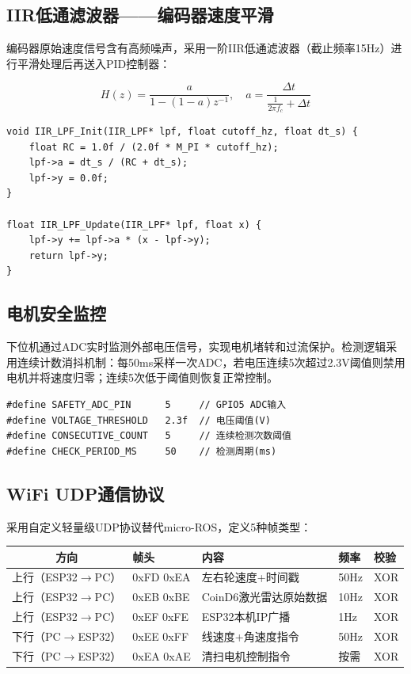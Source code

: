 \documentclass[12pt,a4paper]{ctexart}
\begin{document}
\subsection{IIR低通滤波器——编码器速度平滑}

编码器原始速度信号含有高频噪声，采用一阶IIR低通滤波器（截止频率15Hz）进行平滑处理后再送入PID控制器：

\begin{equation}
    H(z) = \frac{a}{1-(1-a)z^{-1}}, \quad a = \frac{\Delta t}{\frac{1}{2\pi f_c} + \Delta t}
\end{equation}

\begin{lstlisting}[style=cstyle, caption={IIR低通滤波器实现（截止频率15Hz）}]
void IIR_LPF_Init(IIR_LPF* lpf, float cutoff_hz, float dt_s) {
    float RC = 1.0f / (2.0f * M_PI * cutoff_hz);
    lpf->a = dt_s / (RC + dt_s);
    lpf->y = 0.0f;
}

float IIR_LPF_Update(IIR_LPF* lpf, float x) {
    lpf->y += lpf->a * (x - lpf->y);
    return lpf->y;
}
\end{lstlisting}

\subsection{电机安全监控}

下位机通过ADC实时监测外部电压信号，实现电机堵转和过流保护。检测逻辑采用连续计数消抖机制：每50ms采样一次ADC，若电压连续5次超过2.3V阈值则禁用电机并将速度归零；连续5次低于阈值则恢复正常控制。

\begin{lstlisting}[style=cstyle, caption={电机安全检测参数}]
#define SAFETY_ADC_PIN      5     // GPIO5 ADC输入
#define VOLTAGE_THRESHOLD   2.3f  // 电压阈值(V)
#define CONSECUTIVE_COUNT   5     // 连续检测次数阈值
#define CHECK_PERIOD_MS     50    // 检测周期(ms)
\end{lstlisting}

\subsection{WiFi UDP通信协议}

采用自定义轻量级UDP协议替代micro-ROS，定义5种帧类型：

\begin{center}
\begin{tabular}{cllll}
\toprule
\textbf{方向} & \textbf{帧头} & \textbf{内容} & \textbf{频率} & \textbf{校验} \\
\midrule
上行（ESP32$\to$PC） & 0xFD 0xEA & 左右轮速度+时间戳 & 50Hz & XOR \\
上行（ESP32$\to$PC） & 0xEB 0xBE & CoinD6激光雷达原始数据 & 10Hz & XOR \\
上行（ESP32$\to$PC） & 0xEF 0xFE & ESP32本机IP广播 & 1Hz & XOR \\
下行（PC$\to$ESP32） & 0xEE 0xFF & 线速度+角速度指令 & 50Hz & XOR \\
下行（PC$\to$ESP32） & 0xEA 0xAE & 清扫电机控制指令 & 按需 & XOR \\
\bottomrule
\end{tabular}
\end{center}
\end{document}
